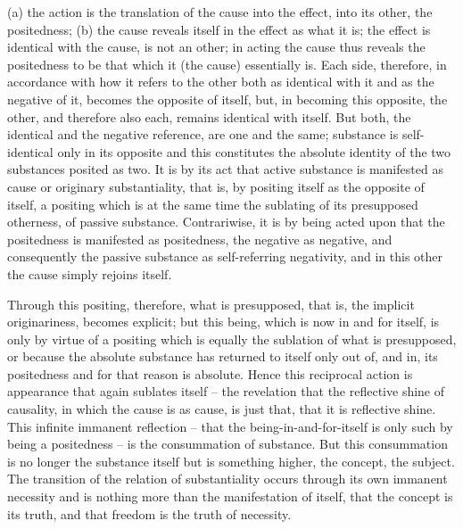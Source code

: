 (a) the action is the translation of the cause into the effect,
into its other, the positedness;
(b) the cause reveals itself in the effect as what it is;
the effect is identical with the cause, is not an other;
in acting the cause thus reveals the positedness to be
that which it (the cause) essentially is.
Each side, therefore, in accordance with how it refers to the other both
as identical with it and as the negative of it, becomes the opposite of
itself, but, in becoming this opposite, the other, and therefore also each,
remains identical with itself.
But both, the identical and the negative
reference, are one and the same; substance is self-identical only in its
opposite and this constitutes the absolute identity of the two substances
posited as two. It is by its act that active substance is manifested as cause
or originary substantiality, that is, by positing itself as the opposite of
itself, a positing which is at the same time the sublating of its presupposed
otherness, of passive substance. Contrariwise, it is by being acted upon that
the positedness is manifested as positedness, the negative as negative, and
consequently the passive substance as self-referring negativity, and in this
other the cause simply rejoins itself.

Through this positing, therefore, what is presupposed,
that is, the implicit originariness, becomes explicit;
but this being, which is now in and for itself, is only by virtue of a positing which
is equally the sublation of what is presupposed, or because the absolute
substance has returned to itself only out of, and in, its positedness and for
that reason is absolute.
Hence this reciprocal action is appearance that
again sublates itself – the revelation that the reflective shine of causality, in
which the cause is as cause, is just that, that it is reflective shine.
This infinite immanent reflection – that the being-in-and-for-itself is
only such by being a positedness – is the consummation of substance.
But this consummation is no longer the substance itself
but is something higher, the concept, the subject.
The transition of the relation of substantiality occurs through
its own immanent necessity and is nothing more than the manifestation
of itself, that the concept is its truth, and that freedom is the truth of
necessity.

